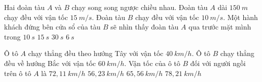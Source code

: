 \begin{ex}%
Hai đoàn tàu $A$ và $B$ chạy song song ngược chiều nhau. Đoàn tàu $A$ dài $150\ m$ chạy đều với vận tốc $15\ m/s$. Đoàn tàu $B$ chạy đều với vận tốc $10\ m/s$. Một hành khách đứng bên cửa sổ của tàu $B$ sẽ nhìn thấy đoàn tàu $A$ qua trước mặt mình trong
\choice
{$10\ s$}
{$15\ s$}
{$30\ s$}
{\True $6\ s$}
\end{ex}	
\begin{ex}%
Ô tô $A$ chạy thẳng đều theo hướng Tây với vận tốc $40\ km/h$. Ô tô $B$ chạy thẳng đều về hướng Bắc với vận tốc $60\ km/h$. Vận tốc của ô tô $B$ đối với người ngồi trên ô tô $A$ là
\choice
{\True $72,11\ km/h$}
{$56,23\ km/h$}
{$65,56\ km/h$}
{$78,21\ km/h$}	
\end{ex}


